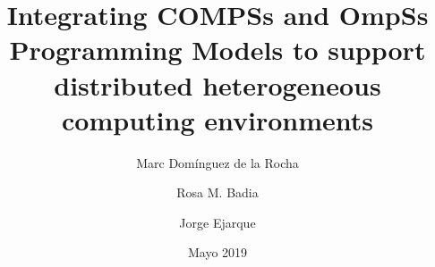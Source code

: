 \documentclass[a4paper]{article}
\title{Integrating COMPSs and OmpSs Programming Models to support distributed heterogeneous computing environments}
\author
{
Marc Domínguez de la Rocha
\and
Rosa M. Badia
\and
Jorge Ejarque
}
\date{Mayo 2019}
\begin{document}
\maketitle

\newpage
\renewcommand{\contentsname}{Índice}
\tableofcontents
\newpage




%
\nocite{*}
\end{document}
